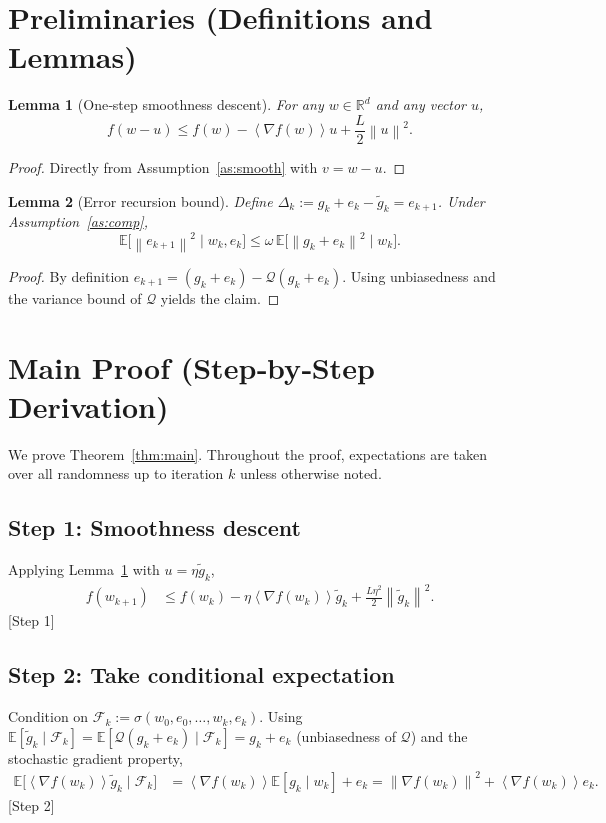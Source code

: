 \documentclass{article}
\newtheorem{lemma}{Lemma}
\newcommand{\E}{\mathbb{E}}
\newcommand{\R}{\mathbb{R}}
\newcommand{\norm}[1]{\left\lVert #1\right\rVert}
\newcommand{\inner}[1]{\left\langle #1\right\rangle}
\newcommand{\Q}{\mathcal{Q}}
\begin{document}
\newpage
\section*{Preliminaries (Definitions and Lemmas)}
\begin{lemma}[One‑step smoothness descent]\label{lem:smooth}
For any $w\in\R^{d}$ and any vector $u$,
\[
    f(w-u)\le f(w)-\inner{\nabla f(w)}{u}+\frac{L}{2}\norm{u}^{2}.
\]
\end{lemma}
\begin{proof}
Directly from Assumption~\ref{as:smooth} with $v=w-u$.
\end{proof}

\begin{lemma}[Error recursion bound]\label{lem:error}
Define $\Delta_k:=g_k+e_k-\tilde g_k=e_{k+1}$. Under Assumption~\ref{as:comp},
\[
    \E\!\big[\norm{e_{k+1}}^{2}\mid w_k,e_k\big]
    \le\omega\,\E\!\big[\norm{g_k+e_k}^{2}\mid w_k\big].
\]
\end{lemma}
\begin{proof}
By definition $e_{k+1}= (g_k+e_k)-\Q(g_k+e_k)$. Using unbiasedness and the variance
bound of $\Q$ yields the claim.
\end{proof}

\section*{Main Proof (Step‑by‑Step Derivation)}
We prove Theorem~\ref{thm:main}. Throughout the proof, expectations are taken over all
randomness up to iteration $k$ unless otherwise noted.

\subsection*{Step 1: Smoothness descent}
Applying Lemma~\ref{lem:smooth} with $u=\eta\tilde g_k$,
\begin{align}
    f(w_{k+1})
    &\le f(w_k)-\eta\inner{\nabla f(w_k)}{\tilde g_k}
      +\frac{L\eta^{2}}{2}\norm{\tilde g_k}^{2}.
    \label{eq:descent}
\end{align}
[Step 1]

\subsection*{Step 2: Take conditional expectation}
Condition on $\mathcal{F}_k:=\sigma(w_0,e_0,\dots,w_k,e_k)$.
Using $\E[\tilde g_k\mid\mathcal{F}_k]=\E[\Q(g_k+e_k)\mid\mathcal{F}_k]
= g_k+e_k$ (unbiasedness of $\Q$) and the stochastic gradient property,
\begin{align}
    \E\!\big[\inner{\nabla f(w_k)}{\tilde g_k}\mid\mathcal{F}_k\big]
    &=\inner{\nabla f(w_k)}{\E[g_k\mid w_k]+e_k}
      =\norm{\nabla f(w_k)}^{2}+\inner{\nabla f(w_k)}{e_k}.
    \label{eq:exp_inner}
\end{align}
[Step 2]
\end{document}
